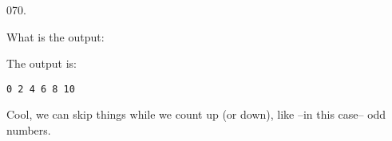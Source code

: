 \documentclass[]{book}
\newenvironment{Shaded}{}{}
\newcommand{\BuiltInTok}[1]{#1}
\newcommand{\ControlFlowTok}[1]{\textcolor[rgb]{0.00,0.44,0.13}{\textbf{#1}}}
\newcommand{\DataTypeTok}[1]{\textcolor[rgb]{0.56,0.13,0.00}{#1}}
\newcommand{\DecValTok}[1]{\textcolor[rgb]{0.25,0.63,0.44}{#1}}
\newcommand{\NormalTok}[1]{#1}
\newcommand{\StringTok}[1]{\textcolor[rgb]{0.25,0.44,0.63}{#1}}
\begin{document}
\vspace{2mm}\noindent\hrulefill{}

\begin{minipage}{\linewidth}\noindent
{\tiny 070.}\\
\begin{minipage}[t]{.485\linewidth}

What is the output:

\begin{framed}

\begin{Shaded}
\end{Shaded}

\end{framed}

\end{minipage}
\hfill
\begin{minipage}[t]{.485\linewidth}

The output is:

\begin{framed}

\begin{verbatim}
0 2 4 6 8 10 
\end{verbatim}

\end{framed}

Cool, we can skip things while we count up (or down), like --in this
case-- odd numbers.

\end{minipage}
\end{minipage}

\vspace{2mm}\noindent\hrulefill{}
\end{document}
